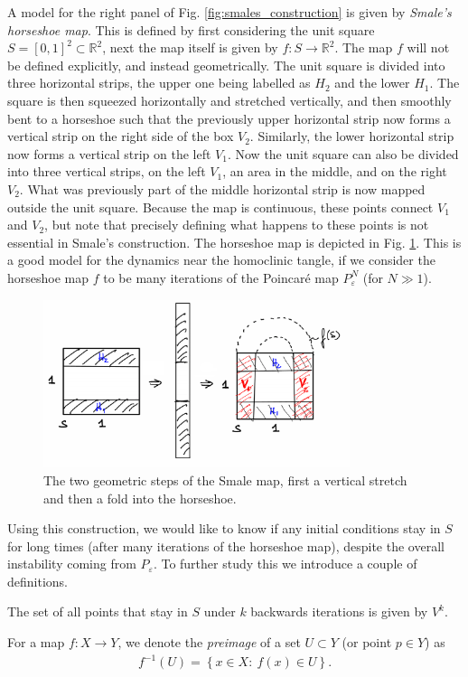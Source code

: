 A model for the right panel of Fig. \ref{fig:smales_construction} is given by \emph{Smale's horseshoe map}. This is defined by first considering the unit square $S=[0,1]^2\subset \mathbb{R}^{2}$, next the map itself is given by $f:S\to\mathbb{R}^{2}$. The map $f$ will not be defined explicitly, and instead geometrically. The unit square is divided into three horizontal strips, the upper one being labelled as $H_2$ and the lower $H_1$. The square is then squeezed horizontally and stretched vertically, and then smoothly bent to a horseshoe such that the previously upper horizontal strip now forms a vertical strip on the right side of the box $V_2$. Similarly, the lower horizontal strip now forms a vertical strip on the left $V_1$. Now the unit square can also be divided into three vertical strips, on the left $V_1$, an area in the middle, and on the right $V_2$. What was previously part of the middle horizontal strip is now mapped outside the unit square. Because the map is continuous, these points connect $V_1$ and $V_2$, but note that precisely defining what happens to these points is not essential in Smale's construction. The horseshoe map is depicted in Fig. \ref{fig:smale_map}. This is a good model for the dynamics near the homoclinic tangle, if we consider the horseshoe map $f$ to be many iterations of the Poincaré map $P^N_\varepsilon$ (for $N\gg 1$).
\begin{figure}[h!]
	\centering
	\includegraphics[width=0.8\textwidth]{figures/ch6/17smale_map.png}
	\caption{The two geometric steps of the Smale map, first a vertical stretch and then a fold into the horseshoe.}
	\label{fig:smale_map}
\end{figure}

Using this construction, we would like to know if any initial conditions stay in $S$ for long times (after many iterations of the horseshoe map), despite the overall instability coming from $P_{\varepsilon}$. To further study this we introduce a couple of definitions.
\begin{definition}
	The set of all points that stay in $S$ under $k$ backwards iterations is given by $V^{k}$.
\end{definition}
\begin{definition}[]
	For a map $f:X \to Y$, we denote the \emph{preimage} of a set $U\subset Y$ (or point $p\in Y$) as
	\begin{align}
		\boxed{
			f^{-1}(U) = \left\{ x\in X:\ f(x) \in U\right\}.
		}
	\end{align}
\end{definition}


